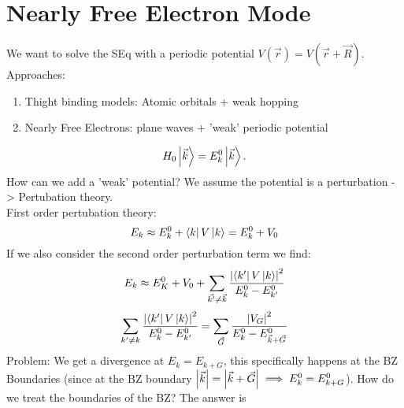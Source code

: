 \documentclass{report}
\begin{document}
\section{Nearly Free Electron Mode}
We want to solve the SEq with a periodic potential $V(\vec{r}) = V(\vec{r} + \vec{R})$.
Approaches:
\begin{enumerate}
	\item Thight binding models: Atomic orbitals + weak hopping
	\item Nearly Free Electrons: plane waves + 'weak' periodic potential
\end{enumerate}
\[
H_0 \ket{\vec{k}} = E_k^0 \ket{\vec{k}} 
.\] How can we add a 'weak' potential? We assume the potential is a perturbation -> Pertubation theory.\\
First order pertubation theory: \[
E_k \approx E_k^0 + \bra{k} V \ket{k} = E_k^0 + V_0 
\] If we also consider the second order perturbation term we find: \[
E_k \approx E_K^0 + V_0 + \sum_{\vec{k'} \neq \vec{k}} \frac{\abs{\bra{k'} V \ket{k} }^2}{E_k^0 - E_{k'}^0}
\] \[
\sum_{k' \neq k} \frac{\abs{\bra{k'} V \ket{k} }^2}{E_k^0 - E_{k'}^0} = \sum_{\vec{G}} \frac{\abs{V_G}^2}{E_k^0 - E_{\vec{k}+\vec{G}}^0}
\] Problem: We get a divergence at $E_k = E_{k + G}$, this specifically happens at the BZ Boundaries (since at the BZ boundary $\abs{\vec{k}} = \abs{\vec{k} + \vec{G}} \implies E_k^0 = E_{k+G}^0$).
How do we treat the boundaries of the BZ? The answer is
\end{document}
